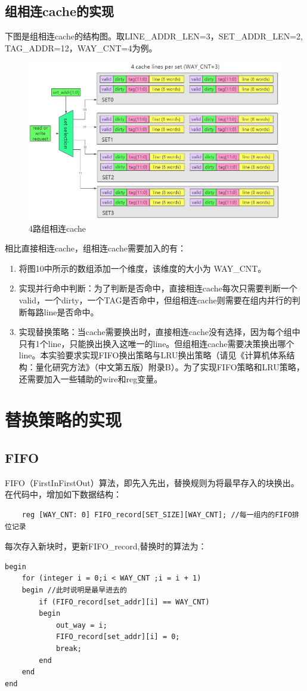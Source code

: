 \documentclass{ctexart}
\begin{document}
\subsection{\hei 组相连cache的实现}
下图是组相连cache的结构图。取LINE\_ADDR\_LEN=3，SET\_ADDR\_LEN=2, TAG\_ADDR=12，WAY\_CNT=4为例。
\par
\par \begin{figure}[H]
    \centering
    \includegraphics[scale=0.65]{4lzxl.png}
    \caption{4路组相连cache}
\end{figure}
\par 相比直接相连cache，组相连cache需要加入的有：
\begin{enumerate}
    \item 将图10中所示的数组添加一个维度，该维度的大小为 WAY\_CNT。
    \item 实现并行命中判断：为了判断是否命中，直接相连cache每次只需要判断一个valid，一个dirty，一个TAG是否命中，但组相连cache则需要在组内并行的判断每路line是否命中。
    \item 实现替换策略：当cache需要换出时，直接相连cache没有选择，因为每个组中只有1个line，只能换出换入这唯一的line。但组相连cache需要决策换出哪个line。本实验要求实现FIFO换出策略与LRU换出策略（请见《计算机体系结构：量化研究方法》（中文第五版）附录B）。为了实现FIFO策略和LRU策略，还需要加入一些辅助的wire和reg变量。
\end{enumerate}
\section{\hei 替换策略的实现}
\subsection{\hei FIFO}
FIFO（First\space In\space First\space Out）算法，即先入先出，替换规则为将最早存入的块换出。在代码中，增加如下数据结构：
\begin{lstlisting}
    reg [WAY_CNT: 0] FIFO_record[SET_SIZE][WAY_CNT]; //每一组内的FIFO排位记录
\end{lstlisting}
\par 每次存入新块时，更新FIFO\_record,替换时的算法为：
\begin{lstlisting}
begin
    for (integer i = 0;i < WAY_CNT ;i = i + 1)
    begin //此时说明是最早进去的
        if (FIFO_record[set_addr][i] == WAY_CNT)
        begin
            out_way = i;
            FIFO_record[set_addr][i] = 0;
            break;
        end
    end
end
\end{lstlisting}
\end{document}
